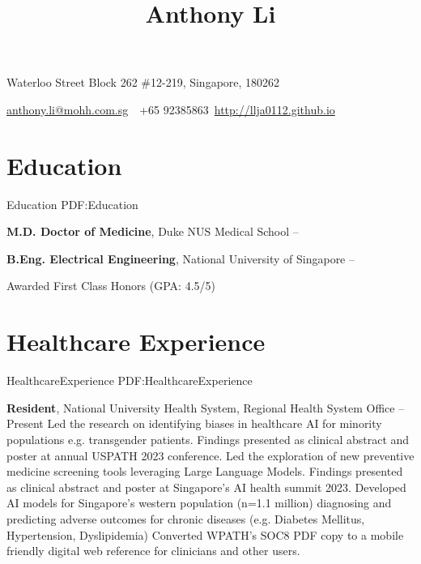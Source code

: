 \documentclass[letterpaper,10pt,oneside]{article}
\newcommand{\CVAuthor}{Anthony Li}
\newcommand{\CVWebpage}{http://llja0112.github.io}
\begin{document}

\title{\CVAuthor}

\begin{subtitle}
{Waterloo Street Block 262 \#12-219, Singapore, 180262}
\par
\href{mailto:anthony.li@mohh.com.sg}
{anthony.li@mohh.com.sg}
\,\SubBulletSymbol\,
+65 92385863\,
\href{\CVWebpage}
{\CVWebpage}
\end{subtitle}

\begin{body}


\section
{Education}
{Education}
{PDF:Education}

{\textbf{M.D. Doctor of Medicine}, Duke NUS Medical School}
\hfill
{} -- 

\GapNoBreak

\BigGap
{\textbf{B.Eng. Electrical Engineering}, National University of Singapore}
\hfill
{} --

\GapNoBreak
\BulletItem
Awarded First Class Honors (GPA: 4.5/5)

\section
{Healthcare Experience}
{HealthcareExperience}
{PDF:HealthcareExperience}

{\textbf{Resident}, National University Health System, Regional Health System Office}
\hfill
{} --
Present
\BulletItem
Led the research on identifying biases in healthcare AI for minority populations e.g. transgender patients. Findings presented as clinical abstract and poster at annual USPATH 2023 conference.
\BulletItem
Led the exploration of new preventive medicine screening tools leveraging Large Language Models. Findings presented as clinical abstract and poster at Singapore's AI health summit 2023.  
\BulletItem
Developed AI models for Singapore's western population (n=1.1 million) diagnosing and predicting adverse outcomes for chronic diseases (e.g. Diabetes Mellitus, Hypertension, Dyslipidemia)
\BulletItem
Converted WPATH's SOC8 PDF copy to a mobile friendly digital web reference for clinicians and other users.


\end{body}
\end{document}
